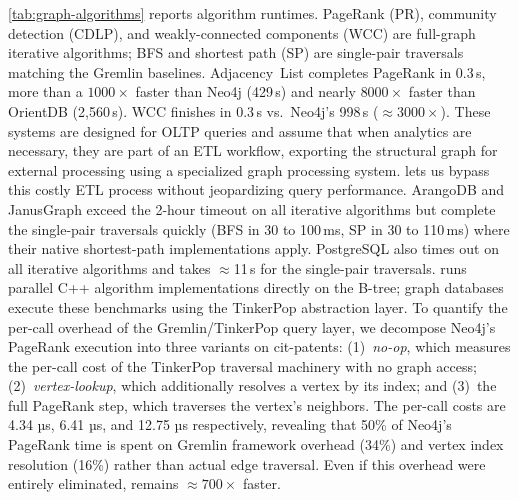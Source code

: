 \autoref{tab:graph-algorithms} reports algorithm runtimes.
PageRank (PR), community detection (CDLP), and weakly-connected components (WCC) are full-graph iterative algorithms; BFS and shortest path (SP) are single-pair traversals matching the Gremlin baselines.
\project{} Adjacency~List completes PageRank in 0.3\,s, more than a $1000\times$ faster than Neo4j (429\,s) and nearly $8000\times$ faster than OrientDB (2{,}560\,s).
WCC finishes in 0.3\,s vs.\ Neo4j's 998\,s ($\approx 3000\times$).
These systems are designed for OLTP queries and assume that when analytics are necessary, they are part of an ETL workflow, exporting the structural graph for external processing using a specialized graph processing system.
\project{} lets us bypass this costly ETL process without jeopardizing query performance.
ArangoDB and JanusGraph exceed the 2-hour timeout on all iterative algorithms but complete the single-pair traversals quickly (BFS in 30 to 100\,ms, SP in 30 to 110\,ms) where their native shortest-path implementations apply.
PostgreSQL also times out on all iterative algorithms and takes $\approx$11\,s for the single-pair traversals.
\project{} runs parallel C++ algorithm implementations directly on the \wt{} B-tree; graph databases execute these benchmarks using the TinkerPop abstraction layer. %
To quantify the per-call overhead of the Gremlin/TinkerPop query layer, we decompose Neo4j's PageRank execution into three variants on cit-patents:
(1)~\emph{no-op}, which measures the per-call cost of the TinkerPop traversal machinery with no graph access;
(2)~\emph{vertex-lookup}, which additionally resolves a vertex by its index; and
(3)~the full PageRank step, which traverses the vertex's neighbors.
The per-call costs are 4.34 µs, 6.41 µs, and 12.75 µs respectively, revealing that 50\% of Neo4j's PageRank time is spent on Gremlin framework overhead (34\%) and vertex index resolution (16\%) rather than actual edge traversal.
Even if this overhead were entirely eliminated, \project{} remains $\approx700\times$ faster.


